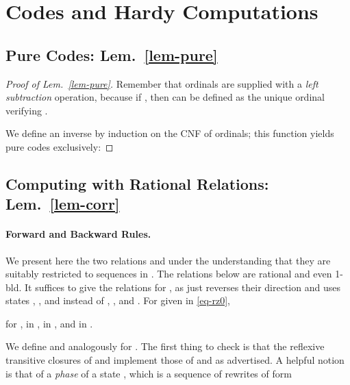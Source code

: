 \section{Codes and Hardy Computations}

\subsection{Pure Codes: Lem.~\ref{lem-pure}}\label{app-pure}
\begin{proof}[Proof of Lem.~\ref{lem-pure}]
  Remember that ordinals are supplied with a \emph{left
  subtraction} operation, because if , then
   can be defined as the unique ordinal verifying
  .

  We define an inverse  by induction on the CNF of ordinals;
  this function yields pure codes exclusively:
  
\end{proof}



\subsection{Computing with Rational Relations:
  Lem.~\ref{lem-corr}}\label{ax-rules}

\paragraph{Forward and Backward Rules.}  We present here the two
relations  and  under the understanding that they are
suitably restricted to sequences in .  The relations below are
rational and even 1-bld.  It suffices to give the relations for ,
as  just reverses their direction and uses states ,
, and  instead of , , and
.  For  given in \eqref{eq-rz0},

for ,  in ,  in , and
 in .

We define  and analogously for .
The first thing to check is that the reflexive transitive closures of
 and  implement those of  and  as advertised.  A
helpful notion is that of a \emph{phase} of a state , which is a
sequence of rewrites of form

